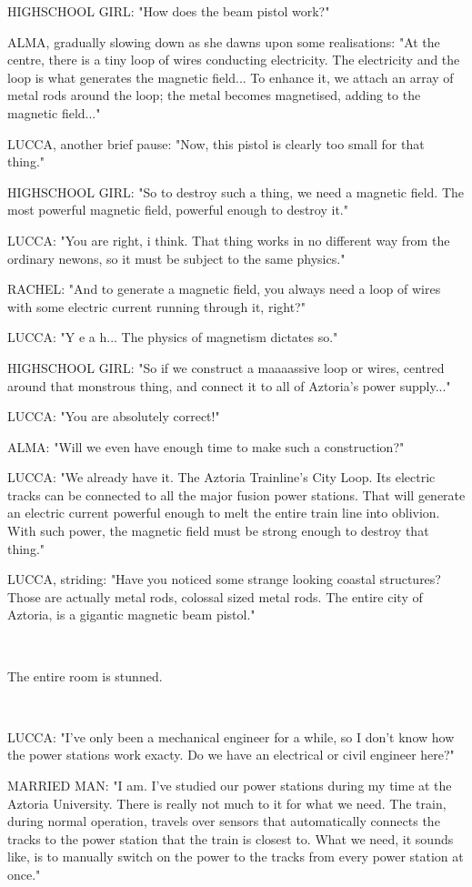 \documentclass[11pt]{article}
\begin{document}
HIGHSCHOOL GIRL: "How does the beam pistol work?"

ALMA, gradually slowing down as she dawns upon some realisations: "At the centre, there is a tiny loop of wires conducting electricity. 
The electricity and the loop is what generates the magnetic field...
To enhance it, we attach an array of metal rods around the loop; the metal becomes magnetised, adding to the magnetic field..."

LUCCA, another brief pause: "Now, this pistol is clearly too small for that thing."

HIGHSCHOOL GIRL: "So to destroy such a thing, we need a magnetic field.
The most powerful magnetic field, powerful enough to destroy it."

LUCCA: "You are right, i think. That thing works in no different way from the ordinary newons, so it must be subject to the same physics."

RACHEL: "And to generate a magnetic field, you always need a loop of wires with some electric current running through it, right?"

LUCCA: "Y e a h... The physics of magnetism dictates so."

HIGHSCHOOL GIRL: "So if we construct a maaaassive loop or wires, centred around that monstrous thing, and connect it to all of Aztoria's power supply..."

LUCCA: "You are absolutely correct!"

ALMA: "Will we even have enough time to make such a construction?"

LUCCA: "We already have it. 
The Aztoria Trainline's City Loop. 
Its electric tracks can be connected to all the major fusion power stations.
That will generate an electric current powerful enough to melt the entire train line into oblivion. 
With such power, the magnetic field must be strong enough to destroy that thing."

LUCCA, striding: "Have you noticed some strange looking coastal structures? 
Those are actually metal rods, colossal sized metal rods.
The entire city of Aztoria, is a gigantic magnetic beam pistol."

\ 

The entire room is stunned. 

\ 

LUCCA: "I've only been a mechanical engineer for a while, so I don't know how the power stations work exacty. Do we have an electrical or civil engineer here?"

MARRIED MAN: "I am. 
I've studied our power stations during my time at the Aztoria University.
There is really not much to it for what we need. 
The train, during normal operation, travels over sensors that automatically connects the tracks to the power station that the train is closest to.
What we need, it sounds like, is to manually switch on the power to the tracks from every power station at once." 
\end{document}
